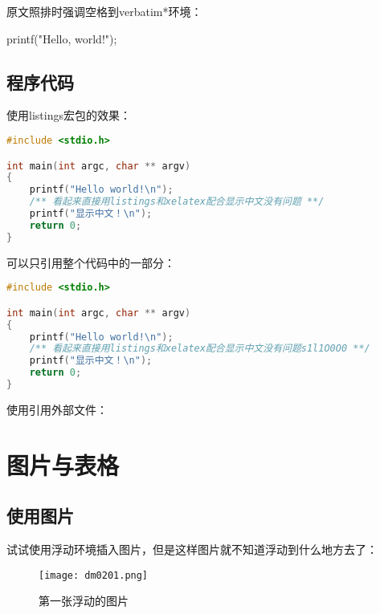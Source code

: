 			原文照排时强调空格到verbatim*环境：
			\begin{verbatim*}
				printf("Hello, world!");
			\end{verbatim*}

		\subsection{程序代码}

			使用listings宏包的效果：

\begin{lstlisting}[language=C]
#include <stdio.h>

int main(int argc, char ** argv)
{
	printf("Hello world!\n");
	/** 看起来直接用listings和xelatex配合显示中文没有问题 **/
	printf("显示中文！\n");
	return 0;
}
\end{lstlisting}

			可以只引用整个代码中的一部分：

\begin{lstlisting}[language=C,firstline=3,lastline=9]
#include <stdio.h>

int main(int argc, char ** argv)
{
	printf("Hello world!\n");
	/** 看起来直接用listings和xelatex配合显示中文没有问题s1l1O0O0 **/
	printf("显示中文！\n");
	return 0;
}
\end{lstlisting}

			使用\verb||引用外部文件：

			

	\section{图片与表格}

		\subsection{使用图片}

			试试使用浮动环境插入图片，但是这样图片就不知道浮动到什么地方去了：

			\begin{figure}[htbp]                        %
				\centering                              %
				\texttt{[image: dm0201.png]} %
				\caption{第一张浮动的图片}            %
				\label{dm0201}                %
			\end{figure}

